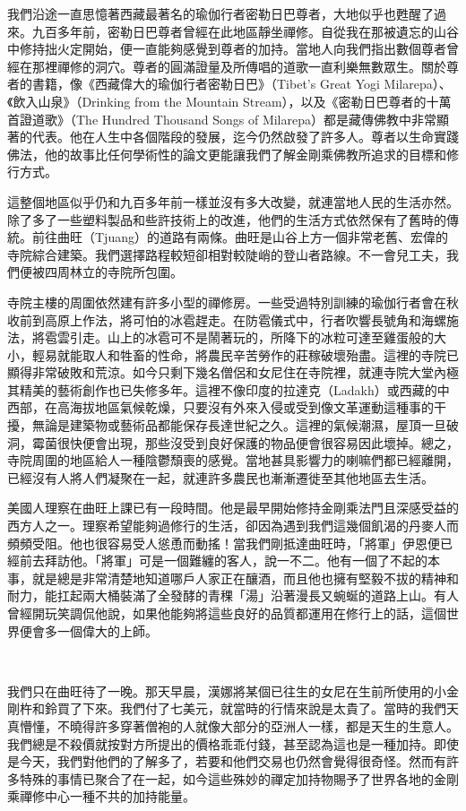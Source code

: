 我們沿途一直思憶著西藏最著名的瑜伽行者密勒日巴尊者，大地似乎也甦醒了過來。九百多年前，密勒日巴尊者曾經在此地區靜坐禪修。自從我在那被遺忘的山谷中修持拙火定開始，便一直能夠感覺到尊者的加持。當地人向我們指出數個尊者曾經在那裡禪修的洞穴。尊者的圓滿證量及所傳唱的道歌一直利樂無數眾生。關於尊者的書籍，像《西藏偉大的瑜伽行者密勒日巴》（Tibet's
Great Yogi Milarepa）、《飲入山泉》（Drinking from the Mountain
Stream），以及《密勒日巴尊者的十萬首證道歌》（The Hundred Thousand Songs
of
Milarepa）都是藏傳佛教中非常顯著的代表。他在人生中各個階段的發展，迄今仍然啟發了許多人。尊者以生命實踐佛法，他的故事比任何學術性的論文更能讓我們了解金剛乘佛教所追求的目標和修行方式。

這整個地區似乎仍和九百多年前一樣並沒有多大改變，就連當地人民的生活亦然。除了多了一些塑料製品和些許技術上的改進，他們的生活方式依然保有了舊時的傳統。前往曲旺（Tjuang）的道路有兩條。曲旺是山谷上方一個非常老舊、宏偉的寺院綜合建築。我們選擇路程較短卻相對較陡峭的登山者路線。不一會兒工夫，我們便被四周林立的寺院所包圍。

寺院主樓的周圍依然建有許多小型的禪修房。一些受過特別訓練的瑜伽行者會在秋收前到高原上作法，將可怕的冰雹趕走。在防雹儀式中，行者吹響長號角和海螺施法，將雹雲引走。山上的冰雹可不是鬧著玩的，所降下的冰粒可達至雞蛋般的大小，輕易就能取人和牲畜的性命，將農民辛苦勞作的莊稼破壞殆盡。這裡的寺院已顯得非常破敗和荒涼。如今只剩下幾名僧侶和女尼住在寺院裡，就連寺院大堂內極其精美的藝術創作也已失修多年。這裡不像印度的拉達克（Ladakh）或西藏的中西部，在高海拔地區氣候乾燥，只要沒有外來入侵或受到像文革運動這種事的干擾，無論是建築物或藝術品都能保存長達世紀之久。這裡的氣候潮濕，屋頂一旦破洞，霉菌很快便會出現，那些沒受到良好保護的物品便會很容易因此壞掉。總之，寺院周圍的地區給人一種陰鬱頹喪的感覺。當地甚具影響力的喇嘛們都已經離開，已經沒有人將人們凝聚在一起，就連許多農民也漸漸遷徙至其他地區去生活。

美國人理察在曲旺上課已有一段時間。他是最早開始修持金剛乘法門且深感受益的西方人之一。理察希望能夠過修行的生活，卻因為遇到我們這幾個飢渴的丹麥人而頻頻受阻。他也很容易受人慫恿而動搖！當我們剛抵達曲旺時，「將軍」伊恩便已經前去拜訪他。「將軍」可是一個難纏的客人，說一不二。他有一個了不起的本事，就是總是非常清楚地知道哪戶人家正在釀酒，而且他也擁有堅毅不拔的精神和耐力，能扛起兩大桶裝滿了全發酵的青稞「湯」沿著漫長又蜿蜒的道路上山。有人曾經開玩笑調侃他說，如果他能夠將這些良好的品質都運用在修行上的話，這個世界便會多一個偉大的上師。

　

我們只在曲旺待了一晚。那天早晨，漢娜將某個已往生的女尼在生前所使用的小金剛杵和鈴買了下來。我們付了七美元，就當時的行情來說是太貴了。當時的我們天真懵懂，不曉得許多穿著僧袍的人就像大部分的亞洲人一樣，都是天生的生意人。我們總是不殺價就按對方所提出的價格乖乖付錢，甚至認為這也是一種加持。即使是今天，我們對他們的了解多了，若要和他們交易也仍然會覺得很奇怪。然而有許多特殊的事情已聚合了在一起，如今這些殊妙的禪定加持物賜予了世界各地的金剛乘禪修中心一種不共的加持能量。

